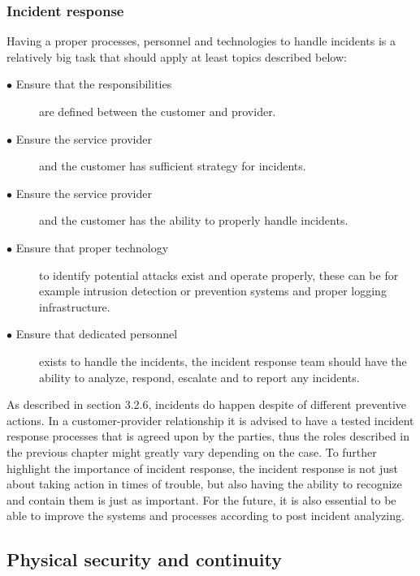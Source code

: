 \documentclass{article}
\begin{document}
\subsubsection{Incident response}
Having a proper processes, personnel and technologies to handle incidents is a relatively big task that should apply at least topics described below:
\begin{description}
	\item[$\bullet$ Ensure that the responsibilities] are defined between the customer and provider.
	\item[$\bullet$ Ensure the service provider] and the customer has sufficient strategy for incidents.
	\item[$\bullet$ Ensure the service provider] and the customer has the ability to properly handle incidents.
	\item[$\bullet$ Ensure that proper technology] to identify potential attacks exist and operate properly, these can be for example intrusion detection or prevention systems and proper logging infrastructure.
	\item[$\bullet$ Ensure that dedicated personnel] exists to handle the incidents, the incident response team should have the ability to analyze, respond, escalate and to report any incidents.
\end{description}
\par
As described in section 3.2.6, incidents do happen despite of different preventive actions. In a customer-provider relationship it is advised to have a tested incident response processes that is agreed upon by the parties, thus the roles described in the previous chapter might greatly vary depending on the case. To further highlight the importance of incident response, the incident response is not just about taking action in times of trouble, but also having the ability to recognize and contain them is just as important. For the future, it is also essential to be able to improve the systems and processes according to post incident analyzing.
\subsection{Physical security and continuity}
\end{document}
